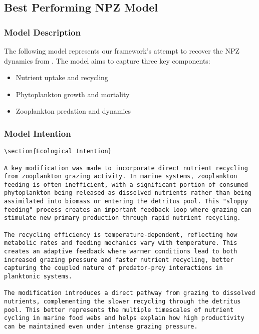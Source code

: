 \subsection{Best Performing NPZ Model}

\subsubsection{Model Description}
The following model represents our framework's attempt to recover the NPZ dynamics from \cite{edwards1999zooplankton}. The model aims to capture three key components:
\begin{itemize}
\item Nutrient uptake and recycling
\item Phytoplankton growth and mortality
\item Zooplankton predation and dynamics
\end{itemize}

\subsubsection{Model Intention}
\begin{lstlisting}
\section{Ecological Intention}

A key modification was made to incorporate direct nutrient recycling from zooplankton grazing activity. In marine systems, zooplankton feeding is often inefficient, with a significant portion of consumed phytoplankton being released as dissolved nutrients rather than being assimilated into biomass or entering the detritus pool. This "sloppy feeding" process creates an important feedback loop where grazing can stimulate new primary production through rapid nutrient recycling.

The recycling efficiency is temperature-dependent, reflecting how metabolic rates and feeding mechanics vary with temperature. This creates an adaptive feedback where warmer conditions lead to both increased grazing pressure and faster nutrient recycling, better capturing the coupled nature of predator-prey interactions in planktonic systems.

The modification introduces a direct pathway from grazing to dissolved nutrients, complementing the slower recycling through the detritus pool. This better represents the multiple timescales of nutrient cycling in marine food webs and helps explain how high productivity can be maintained even under intense grazing pressure.
\end{lstlisting}


